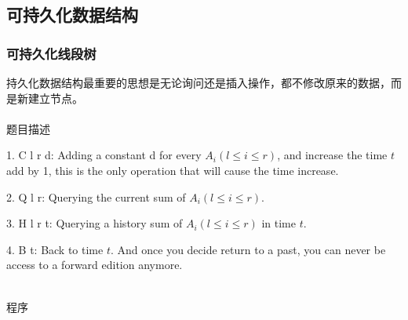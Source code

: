 \subsection{可持久化数据结构}
    \subsubsection{可持久化线段树}
    持久化数据结构最重要的思想是无论询问还是插入操作，都不修改原来的数据，而是新建立节点。
	~\\
    ~\\
    \Large{题目描述} \par
	\small
    1. C l r d: Adding a constant d for every $A_i(l\leq i\leq r)$, and increase the time $t$ add by 1, this is the only operation that will cause the time increase. \par
    2. Q l r: Querying the current sum of $A_i(l \leq i \leq r)$. \par
    3. H l r t: Querying a history sum of $A_i(l \leq i\leq r)$ in time $t$. \par
    4. B t: Back to time $t$. And once you decide return to a past, you can never be access to a forward edition anymore.\par
    ~\\
    \Large{程序} \par
	\small
